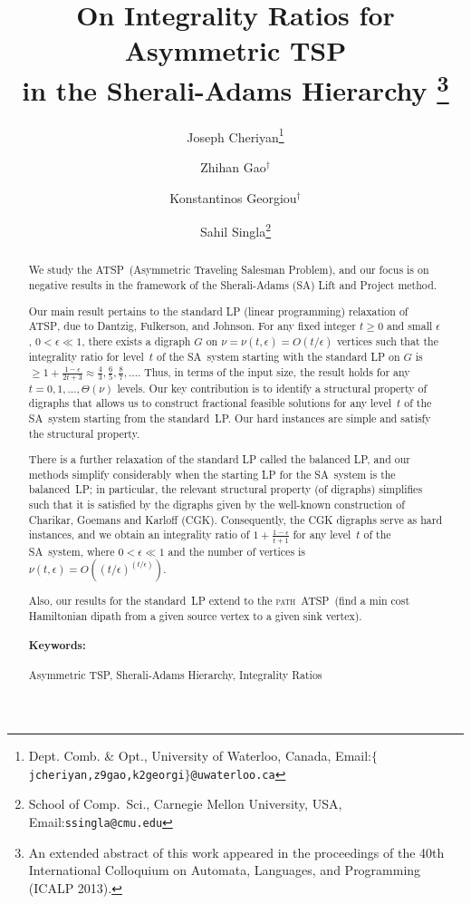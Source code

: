 \documentclass[11pt]{article}
\newcommand{\iSA}{\textsf{SA}}
\newcommand{\atsp}{\textsc{ATSP}}
\newcommand{\pathatsp}{\textsc{path~ATSP}}
\begin{document}
\title{On Integrality Ratios for Asymmetric TSP \\
	in the Sherali-Adams Hierarchy
\footnote{An extended abstract of this work appeared in the proceedings of the 40th International Colloquium on Automata, Languages, and Programming ({ICALP} 2013).}
}


\author{Joseph Cheriyan\thanks{
 Dept. Comb. \& Opt., University of Waterloo, Canada,
 Email:\texttt{$\{$jcheriyan,z9gao,k2georgi$\}$@uwaterloo.ca}} 
\and Zhihan Gao$^\dagger$  
\and Konstantinos Georgiou$^\dagger$ 
\and
Sahil Singla\thanks{School of Comp.\ Sci., Carnegie Mellon University, USA, 
Email:\texttt{ssingla@cmu.edu}
}
}





\maketitle

\begin{abstract}
We study the \atsp\ (Asymmetric Traveling Salesman Problem), and our
focus is on negative results in the framework of the Sherali-Adams
(\iSA) Lift and Project method.


Our main result pertains to the standard LP (linear programming)
relaxation of \atsp, due to Dantzig, Fulkerson, and Johnson.
For any fixed integer $t\ge0$ and small $\epsilon$,
$0<\epsilon\ll{1}$,
there exists a digraph $G$ on
$\nu=\nu(t,\epsilon)=O(t/\epsilon)$
vertices such that the integrality ratio for level~$t$ of the \iSA\ system
starting with the standard LP on $G$ is
$\ge 1+\frac{1-\epsilon}{2t+3} \approx \frac43, \frac65, \frac87, \dots$.
Thus, in terms of the input size,
the result holds for any $t = 0,1,\dots,\Theta(\nu)$ levels.
Our key contribution is to identify
a structural property of digraphs that
allows us to construct fractional feasible solutions
for any level~$t$ of the \iSA\ system starting from the standard~LP.
Our hard instances are simple and satisfy the structural property.

There is a further relaxation of the standard LP called the
balanced LP, and our methods simplify considerably
when the starting LP for the \iSA\ system is the balanced~LP;
in particular, the relevant structural property (of digraphs)
simplifies such that
it is satisfied by the digraphs given by
the well-known construction of Charikar, Goemans and Karloff (CGK).
Consequently, the CGK digraphs serve as hard instances,
and we obtain an integrality ratio of  $1 +\frac{1-\epsilon}{t+1}$
for any level~$t$ of the \iSA\ system,
where $0<\epsilon\ll{1}$
and the number of vertices is
$\nu(t,\epsilon)=O((t/\epsilon)^{(t/\epsilon)})$.

Also, our results for the standard~LP extend to the \pathatsp\ (find a
min cost Hamiltonian dipath from a given source vertex to a given sink
vertex).

\paragraph{Keywords:}Asymmetric TSP, Sherali-Adams Hierarchy, Integrality Ratios
\end{abstract}
\end{document}
